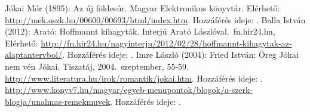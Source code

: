 \documentclass{thesis-ekf}
\theoremstyle{definition}
\begin{document}
    \begin{thebibliography}{}
         Jókai Mór (1895): Az új földesúr. Magyar Elektronikus könyvtár.
            Elérhető: \url{http://mek.oszk.hu/00600/00693/html/index.htm}. Hozzáférés ideje: .
         Balla István (2012): Arató: Hoffmannt kihagyták. Interjú Arató Lászlóval.~fn.hir24.hu, 
            Elérhető: \url{http://fn.hir24.hu/nagyinterju/2012/02/28/hoffmannt-kihagytak-az-alaptantervbol/}. Hozzáférés ideje: .
         Imre László (2004): Fried István: Öreg Jókai nem vén Jókai. Tiszatáj, 2004.~szeptember, 55-59.
         \url{http://www.literatura.hu/irok/romantik/jokai.htm}. Hozzáférés ideje: .
         \url{http://www.konyv7.hu/magyar/egyeb-menupontok/blogok/a-szerk-blogja/unalmas-remekmuvek}.
            Hozzáférés ideje: .
    \end{thebibliography}
\end{document}
